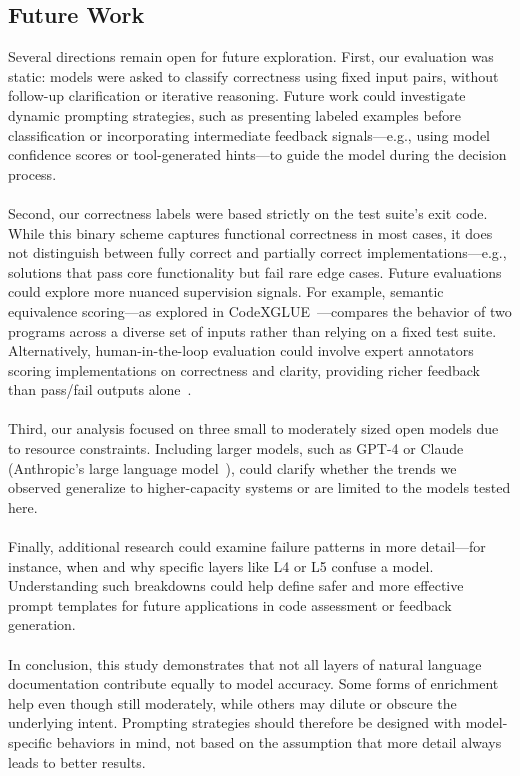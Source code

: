 \documentclass[a4paper]{usiinfbachelorproject}
\begin{document}
\subsection*{Future Work}
Several directions remain open for future exploration. First, our evaluation was static: models were asked to classify correctness using fixed input pairs, without follow-up clarification or iterative reasoning. Future work could investigate dynamic prompting strategies, such as presenting labeled examples before classification or incorporating intermediate feedback signals—e.g., using model confidence scores or tool-generated hints—to guide the model during the decision process. \\
\\
Second, our correctness labels were based strictly on the test suite's exit code. While this binary scheme captures functional correctness in most cases, it does not distinguish between fully correct and partially correct implementations—e.g., solutions that pass core functionality but fail rare edge cases. Future evaluations could explore more nuanced supervision signals. For example, semantic equivalence scoring—as explored in CodeXGLUE~\cite{Lu2021codexglue}—compares the behavior of two programs across a diverse set of inputs rather than relying on a fixed test suite. Alternatively, human-in-the-loop evaluation could involve expert annotators scoring implementations on correctness and clarity, providing richer feedback than pass/fail outputs alone~\cite{smith2021human}. \\
\\
Third, our analysis focused on three small to moderately sized open models due to resource constraints. Including larger models, such as GPT-4 or Claude (Anthropic's large language model~\cite{claude2023blog}), could clarify whether the trends we observed generalize to higher-capacity systems or are limited to the models tested here.\\
\\
Finally, additional research could examine failure patterns in more detail—for instance, when and why specific layers like L4 or L5 confuse a model. Understanding such breakdowns could help define safer and more effective prompt templates for future applications in code assessment or feedback generation.\\
\\
In conclusion, this study demonstrates that not all layers of natural language documentation contribute equally to model accuracy. Some forms of enrichment help even though still moderately, while others may dilute or obscure the underlying intent. Prompting strategies should therefore be designed with model-specific behaviors in mind, not based on the assumption that more detail always leads to better results.\\
\end{document}
